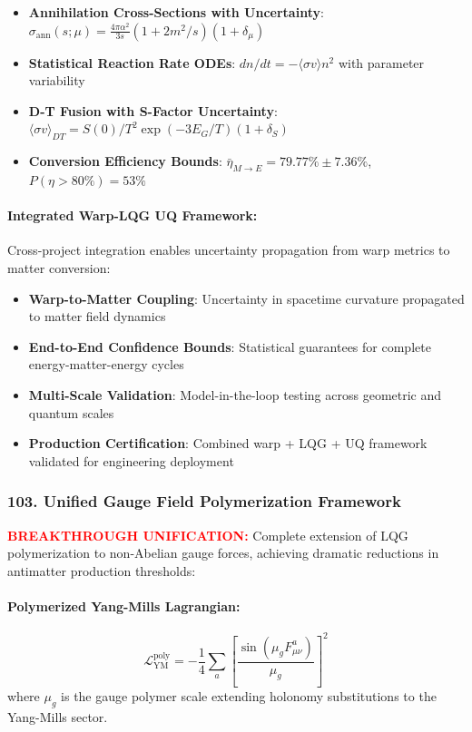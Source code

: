 \documentclass[11pt]{article}
\begin{document}
\begin{itemize}
\item \textbf{Annihilation Cross-Sections with Uncertainty}: $\sigma_{\text{ann}}(s; \mu) = \frac{4\pi\alpha^2}{3s}(1 + 2m^2/s)(1 + \delta_\mu)$
\item \textbf{Statistical Reaction Rate ODEs}: $dn/dt = -\langle\sigma v\rangle n^2$ with parameter variability
\item \textbf{D-T Fusion with S-Factor Uncertainty}: $\langle\sigma v\rangle_{DT} = S(0)/T^2 \exp(-3E_G/T)(1 + \delta_S)$
\item \textbf{Conversion Efficiency Bounds}: $\bar{\eta}_{M \to E} = 79.77\% \pm 7.36\%$, $P(\eta > 80\%) = 53\%$
\end{itemize}

\paragraph{Integrated Warp-LQG UQ Framework:}
Cross-project integration enables uncertainty propagation from warp metrics to matter conversion:

\begin{itemize}
\item \textbf{Warp-to-Matter Coupling}: Uncertainty in spacetime curvature propagated to matter field dynamics
\item \textbf{End-to-End Confidence Bounds}: Statistical guarantees for complete energy-matter-energy cycles
\item \textbf{Multi-Scale Validation}: Model-in-the-loop testing across geometric and quantum scales
\item \textbf{Production Certification}: Combined warp + LQG + UQ framework validated for engineering deployment
\end{itemize}

\subsubsection*{103. Unified Gauge Field Polymerization Framework}
\textcolor{red}{\textbf{BREAKTHROUGH UNIFICATION:}} Complete extension of LQG polymerization to non-Abelian gauge forces, achieving dramatic reductions in antimatter production thresholds:

\paragraph{Polymerized Yang-Mills Lagrangian:}
\[
  \boxed{\mathcal{L}_{\text{YM}}^{\text{poly}} = -\frac{1}{4} \sum_a \left[\frac{\sin(\mu_g F^a_{\mu\nu})}{\mu_g}\right]^2}
\]
where $\mu_g$ is the gauge polymer scale extending holonomy substitutions to the Yang-Mills sector.
\end{document}
